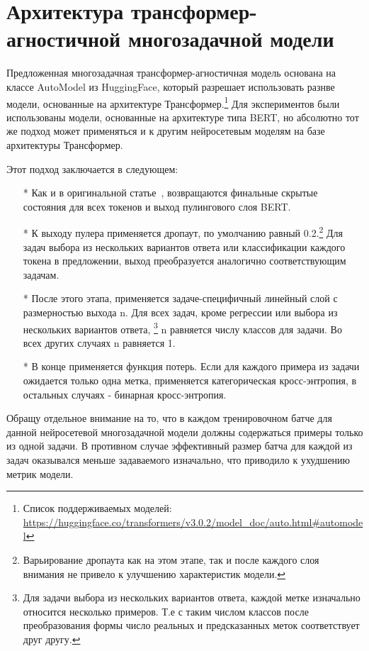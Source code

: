 \section{Архитектура трансформер-агностичной многозадачной модели}\label{ch:tr-ag:architecture} 
Предложенная многозадачная трансформер-агностичная модель основана на классе {AutoModel} из HuggingFace, который разрешает использовать разнве модели, основанные на архитектуре Трансформер.\footnote{Список поддерживаемых моделей: \url{https://huggingface.co/transformers/v3.0.2/model_doc/auto.html\#automodel}} Для экспериментов были использованы модели, основанные на архитектуре типа BERT, но абсолютно тот же подход может применяться и к другим нейросетевым моделям на базе архитектуры Трансформер.

Этот подход заключается в следующем:
\begin{itemize}

  \item[*] Как и в оригинальной статье~\cite{bert}, возвращаются финальные скрытые состояния для всех токенов и выход пулингового слоя BERT. 
  
  \item[*] К выходу пулера применяется дропаут, по умолчанию равный 0.2.\footnote{Варьирование дропаута как на этом этапе, так и после каждого слоя внимания не привело к улучшению характеристик модели.} Для задач выбора из нескольких вариантов ответа или классификации каждого токена в предложении, выход преобразуется аналогично соответствующим задачам.

  \item[*] После этого этапа, применяется задаче-специфичный линейный слой с размерностью выхода {n}. Для всех задач, кроме регрессии или выбора из нескольких вариантов ответа, \footnote{Для задачи выбора из нескольких вариантов ответа, каждой метке изначально относится несколько примеров. Т.е с таким числом классов после преобразования формы число реальных и предсказанных меток соответствует друг другу.} {n} равняется числу классов для задачи. Во всех других случаях {n} равняется 1.
 
  \item[*]В конце применяется функция потерь. Если для каждого примера из задачи ожидается только одна метка, применяется категорическая кросс-энтропия, в остальных случаях - бинарная кросс-энтропия. 

\end{itemize}

Обращу отдельное внимание на то, что в каждом тренировочном батче для данной нейросетевой многозадачной модели должны содержаться примеры только из одной задачи. В противном случае эффективный размер батча для каждой из задач оказывался меньше задаваемого изначально, что приводило к ухудшению метрик модели. 

